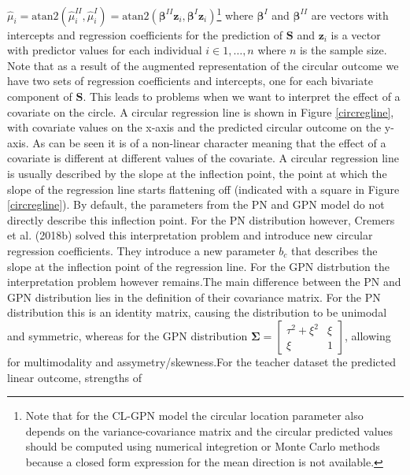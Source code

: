 \documentclass[man]{apa6}
\let\rmarkdownfootnote\footnote%
\def\footnote{\protect\rmarkdownfootnote}
\theoremstyle{definition}
\theoremstyle{definition}
\theoremstyle{definition}
\theoremstyle{remark}
\begin{document}
\(\hat{\mu}_i = \mbox{atan2}(\hat{\mu}_i^{II}, \hat{\mu}_i^{I}) = \mbox{atan2}(\boldsymbol{\beta}^{II}\boldsymbol{z}_i, \boldsymbol{\beta}^{I}\boldsymbol{z}_i)\)\footnote{Note that for the CL-GPN
model the circular location parameter also depends on the variance-covariance
matrix and the circular predicted values should be computed using numerical
integretion or Monte Carlo methods because a closed form expression for the mean
direction is not available.} where \(\boldsymbol{\beta}^{I}\) and
\(\boldsymbol{\beta}^{II}\) are vectors with intercepts and regression
coefficients for the prediction of \(\boldsymbol{S}\) and
\(\boldsymbol{z}_i\) is a vector with predictor values for each
individual \(i \in 1, \dots, n\) where \(n\) is the sample size. Note
that as a result of the augmented representation of the circular outcome
we have two sets of regression coefficients and intercepts, one for each
bivariate component of \(\boldsymbol{S}\). This leads to problems when
we want to interpret the effect of a covariate on the circle. A circular
regression line is shown in Figure \ref{circregline}, with covariate
values on the x-axis and the predicted circular outcome on the y-axis.
As can be seen it is of a non-linear character meaning that the effect
of a covariate is different at different values of the covariate. A
circular regression line is usually described by the slope at the
inflection point, the point at which the slope of the regression line
starts flattening off (indicated with a square in Figure
\ref{circregline}). By default, the parameters from the PN and GPN model
do not directly describe this inflection point. For the PN distribution
however, Cremers et al. (2018b) solved this interpretation problem and
introduce new circular regression coefficients. They introduce a new
parameter \(b_c\) that describes the slope at the inflection point of
the regression line. For the GPN distrbution the interpretation problem
however remains.\newline \indent The main difference between the PN and
GPN distribution lies in the definition of their covariance matrix. For
the PN distribution this is an identity matrix, causing the distribution
to be unimodal and symmetric, whereas for the GPN distribution
\(\boldsymbol{\Sigma} = \begin{bmatrix} \tau^2 + \xi^2 & \xi\\ \xi & 1 \end{bmatrix}\),
allowing for multimodality and assymetry/skewness.\newline \indent For
the teacher dataset the predicted linear outcome, strengths of
\end{document}
